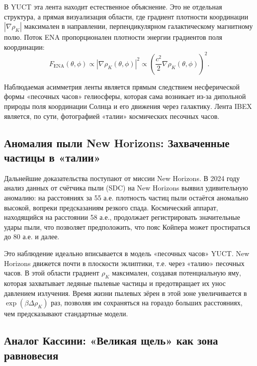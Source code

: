 \documentclass[12pt,a4paper]{article}
\theoremstyle{remark}
\begin{document}
	В YUCT эта лента находит естественное объяснение. Это не отдельная структура, а прямая визуализация области, где градиент плотности координации $|\nabla \rho_K|$ максимален в направлении, перпендикулярном галактическому магнитному полю. Поток ENA пропорционален плотности энергии градиентов поля координации:
	\begin{equation}
		F_{\text{ENA}}(\theta, \phi) \propto |\nabla \rho_K(\theta, \phi)|^2 \propto \left( \frac{c^2}{2} \nabla \rho_K(\theta, \phi) \right)^2.
		\label{eq:coord:ibex_flux}
	\end{equation}
	
	Наблюдаемая асимметрия ленты является прямым следствием несферической формы «песочных часов» гелиосферы, которая сама возникает из-за дипольной природы поля координации Солнца и его движения через галактику. Лента IBEX является, по сути, фотографией «талии» космических песочных часов.
	
	\subsection{Аномалия пыли New Horizons: Захваченные частицы в «талии»}
	\label{subsec:coord:newhorizons}
	
	Дальнейшие доказательства поступают от миссии New Horizons. В 2024 году анализ данных от счётчика пыли (SDC) на New Horizons выявил удивительную аномалию: на расстояниях за 55 а.е. плотность частиц пыли остаётся аномально высокой, вопреки предсказаниям резкого спада. Космический аппарат, находящийся на расстоянии 58 а.е., продолжает регистрировать значительные удары пыли, что позволяет предположить, что пояс Койпера может простираться до 80 а.е. и далее.
	
	Это наблюдение идеально вписывается в модель «песочных часов» YUCT. New Horizons движется почти в плоскости эклиптики, т.е. через «талию» песочных часов. В этой области градиент $\rho_K$ максимален, создавая потенциальную яму, которая захватывает ледяные пылевые частицы и предотвращает их унос давлением излучения. Время жизни пылевых зёрен в этой зоне увеличивается в $\exp(\beta \Delta \rho_K)$ раз, позволяя им сохраняться на гораздо больших расстояниях, чем предсказывают стандартные модели.
	
	\subsection{Аналог Кассини: «Великая щель» как зона равновесия}
	\label{subsec:coord:cassini}
	
\end{document}
